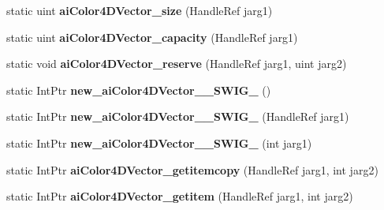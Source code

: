 \begin{DoxyCompactItemize}
\item 
\hypertarget{class_assimp_p_i_n_v_o_k_e_a9860340ff4bf42d5447cfc7d8d6c5258}{static uint {\bfseries ai\+Color4\+D\+Vector\+\_\+size} (Handle\+Ref jarg1)}\label{class_assimp_p_i_n_v_o_k_e_a9860340ff4bf42d5447cfc7d8d6c5258}

\item 
\hypertarget{class_assimp_p_i_n_v_o_k_e_a9bcd73dbbf190477467daf93ea294354}{static uint {\bfseries ai\+Color4\+D\+Vector\+\_\+capacity} (Handle\+Ref jarg1)}\label{class_assimp_p_i_n_v_o_k_e_a9bcd73dbbf190477467daf93ea294354}

\item 
\hypertarget{class_assimp_p_i_n_v_o_k_e_a7a009d1047bf261e9a13af2375d3b1f6}{static void {\bfseries ai\+Color4\+D\+Vector\+\_\+reserve} (Handle\+Ref jarg1, uint jarg2)}\label{class_assimp_p_i_n_v_o_k_e_a7a009d1047bf261e9a13af2375d3b1f6}

\item 
\hypertarget{class_assimp_p_i_n_v_o_k_e_ac5054fed635d6d8ae9bcbae6f96208e6}{static Int\+Ptr {\bfseries new\+\_\+ai\+Color4\+D\+Vector\+\_\+\+\_\+\+S\+W\+I\+G\+\_} ()}\label{class_assimp_p_i_n_v_o_k_e_ac5054fed635d6d8ae9bcbae6f96208e6}

\item 
\hypertarget{class_assimp_p_i_n_v_o_k_e_a8f05235cdb453ddd8a7c15ca7c408134}{static Int\+Ptr {\bfseries new\+\_\+ai\+Color4\+D\+Vector\+\_\+\+\_\+\+S\+W\+I\+G\+\_} (Handle\+Ref jarg1)}\label{class_assimp_p_i_n_v_o_k_e_a8f05235cdb453ddd8a7c15ca7c408134}

\item 
\hypertarget{class_assimp_p_i_n_v_o_k_e_a536dca16b28b05a98922ee4f813167fe}{static Int\+Ptr {\bfseries new\+\_\+ai\+Color4\+D\+Vector\+\_\+\+\_\+\+S\+W\+I\+G\+\_} (int jarg1)}\label{class_assimp_p_i_n_v_o_k_e_a536dca16b28b05a98922ee4f813167fe}

\item 
\hypertarget{class_assimp_p_i_n_v_o_k_e_a50b86b2137cba4af352839733c2f7b34}{static Int\+Ptr {\bfseries ai\+Color4\+D\+Vector\+\_\+getitemcopy} (Handle\+Ref jarg1, int jarg2)}\label{class_assimp_p_i_n_v_o_k_e_a50b86b2137cba4af352839733c2f7b34}

\item 
\hypertarget{class_assimp_p_i_n_v_o_k_e_a86c2ec2121a1685e7994bcc7c079363f}{static Int\+Ptr {\bfseries ai\+Color4\+D\+Vector\+\_\+getitem} (Handle\+Ref jarg1, int jarg2)}\label{class_assimp_p_i_n_v_o_k_e_a86c2ec2121a1685e7994bcc7c079363f}


\end{DoxyCompactItemize}
